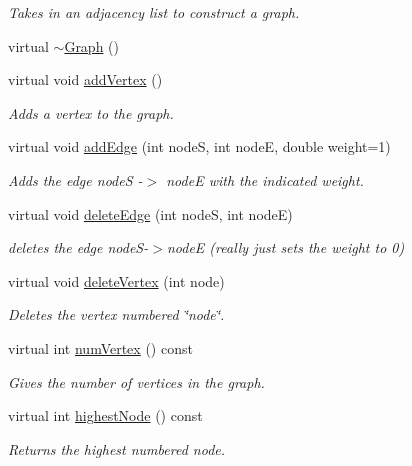 \begin{DoxyCompactItemize}
\begin{DoxyCompactList}\small\item\em Takes in an adjacency list to construct a graph. \end{DoxyCompactList}\item 
virtual \hyperlink{class_alg_lib_1_1_graph_a32cc4dfc6d81626b0175a237b0f2f765}{$\sim$\+Graph} ()
\item 
virtual void \hyperlink{class_alg_lib_1_1_graph_a48bb6066d823827bf8f030b528383b0a}{add\+Vertex} ()
\begin{DoxyCompactList}\small\item\em Adds a vertex to the graph. \end{DoxyCompactList}\item 
virtual void \hyperlink{class_alg_lib_1_1_graph_af5d14ec7c8cda4468f19777c612fce36}{add\+Edge} (int nodeS, int nodeE, double weight=1)
\begin{DoxyCompactList}\small\item\em Adds the edge nodeS -\/$>$ nodeE with the indicated weight. \end{DoxyCompactList}\item 
virtual void \hyperlink{class_alg_lib_1_1_graph_a7d92680925dcacb3761cf1c0cfd375a1}{delete\+Edge} (int nodeS, int nodeE)
\begin{DoxyCompactList}\small\item\em deletes the edge node\+S-\/$>$nodeE (really just sets the weight to 0) \end{DoxyCompactList}\item 
virtual void \hyperlink{class_alg_lib_1_1_graph_a44e68263784ec1eac40136fb2880b27f}{delete\+Vertex} (int node)
\begin{DoxyCompactList}\small\item\em Deletes the vertex numbered \char`\"{}node\char`\"{}. \end{DoxyCompactList}\item 
virtual int \hyperlink{class_alg_lib_1_1_graph_ad755bcd2eb09640252df1b137e18d129}{num\+Vertex} () const 
\begin{DoxyCompactList}\small\item\em Gives the number of vertices in the graph. \end{DoxyCompactList}\item 
virtual int \hyperlink{class_alg_lib_1_1_graph_afcf119c74be1f705e76929fcdf8c6532}{highest\+Node} () const 
\begin{DoxyCompactList}\small\item\em Returns the highest numbered node. \end{DoxyCompactList}\item 

\end{DoxyCompactItemize}

